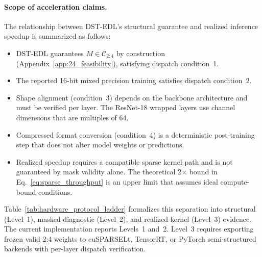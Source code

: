 \paragraph{Scope of acceleration claims.}
The relationship between DST-EDL's structural guarantee and realized
inference speedup is summarized as follows:
\begin{itemize}[leftmargin=*,itemsep=1pt,parsep=0pt]
    \item DST-EDL guarantees $M\in\mathcal{C}_{2:4}$ by construction
          (Appendix~\ref{app:24_feasibility}), satisfying dispatch
          condition~1.
    \item The reported 16-bit mixed precision training satisfies dispatch
          condition~2.
    \item Shape alignment (condition~3) depends on the backbone architecture
          and must be verified per layer. The ResNet-18 wrapped layers use
          channel dimensions that are multiples of 64.
    \item Compressed format conversion (condition~4) is a deterministic
          post-training step that does not alter model weights or predictions.
    \item Realized speedup requires a compatible sparse kernel path and
          is not guaranteed by mask validity alone. The theoretical
          2$\times$ bound in Eq.~\ref{eq:sparse_throughput} is an upper limit
          that assumes ideal compute-bound conditions.
\end{itemize}
Table~\ref{tab:hardware_protocol_ladder} formalizes this separation into
structural (Level~1), masked diagnostic (Level~2), and realized kernel
(Level~3) evidence. The current implementation reports Levels~1 and~2.
Level~3 requires exporting frozen valid 2:4 weights to cuSPARSELt, TensorRT,
or PyTorch semi-structured backends with per-layer dispatch verification.
